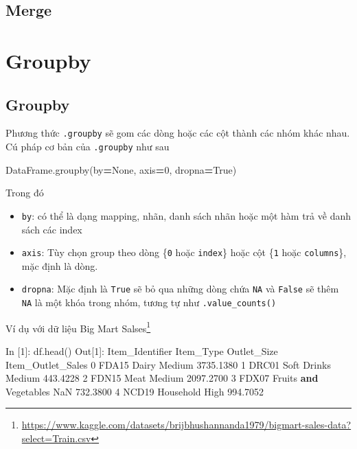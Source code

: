\documentclass[
]{book}
\newenvironment{Shaded}{\begin{snugshade}}{\end{snugshade}}
\newcommand{\DecValTok}[1]{\textcolor[rgb]{0.00,0.00,0.81}{#1}}
\newcommand{\FloatTok}[1]{\textcolor[rgb]{0.00,0.00,0.81}{#1}}
\newcommand{\KeywordTok}[1]{\textcolor[rgb]{0.13,0.29,0.53}{\textbf{#1}}}
\newcommand{\NormalTok}[1]{#1}
\newcommand{\OperatorTok}[1]{\textcolor[rgb]{0.81,0.36,0.00}{\textbf{#1}}}
\newcommand{\VariableTok}[1]{\textcolor[rgb]{0.00,0.00,0.00}{#1}}
\renewcommand{\href}[2]{#2\footnote{\url{#1}}}
\begin{document}
\section{Merge}\label{merge}

\chapter{Groupby}\label{groupby}

\section{Groupby}\label{groupby-1}

Phương thức \texttt{.groupby} sẽ gom các dòng hoặc các cột thành các nhóm khác nhau. Cú pháp cơ bản của \texttt{.groupby} như sau

\begin{Shaded}
\begin{Highlighting}[]
\NormalTok{DataFrame.groupby(by}\OperatorTok{=}\VariableTok{None}\NormalTok{, axis}\OperatorTok{=}\DecValTok{0}\NormalTok{, dropna}\OperatorTok{=}\VariableTok{True}\NormalTok{)}
\end{Highlighting}
\end{Shaded}

Trong đó

\begin{itemize}
\item
  \texttt{by}: có thể là dạng mapping, nhãn, danh sách nhãn hoặc một hàm trả về danh sách các index
\item
  \texttt{axis}: Tùy chọn group theo dòng \{\texttt{0} hoặc \texttt{index}\} hoặc cột \{\texttt{1} hoặc \texttt{columns}\}, mặc định là dòng.
\item
  \texttt{dropna}: Mặc định là \texttt{True} sẽ bỏ qua những dòng chứa \texttt{NA} và \texttt{False} sẽ thêm \texttt{NA} là một khóa trong nhóm, tương tự như \texttt{.value\_counts()}
\end{itemize}

Ví dụ với dữ liệu \href{https://www.kaggle.com/datasets/brijbhushannanda1979/bigmart-sales-data?select=Train.csv}{Big Mart Salses}

\begin{Shaded}
\begin{Highlighting}[]
\NormalTok{In [}\DecValTok{1}\NormalTok{]: df.head()}
\NormalTok{Out[}\DecValTok{1}\NormalTok{]:}
\NormalTok{  Item\_Identifier              Item\_Type Outlet\_Size  Item\_Outlet\_Sales}
\DecValTok{0}\NormalTok{           FDA15                  Dairy      Medium          }\FloatTok{3735.1380}
\DecValTok{1}\NormalTok{           DRC01            Soft Drinks      Medium           }\FloatTok{443.4228}
\DecValTok{2}\NormalTok{           FDN15                   Meat      Medium          }\FloatTok{2097.2700}
\DecValTok{3}\NormalTok{           FDX07  Fruits }\KeywordTok{and}\NormalTok{ Vegetables         NaN           }\FloatTok{732.3800}
\DecValTok{4}\NormalTok{           NCD19              Household        High           }\FloatTok{994.7052}
\end{Highlighting}
\end{Shaded}
\end{document}
